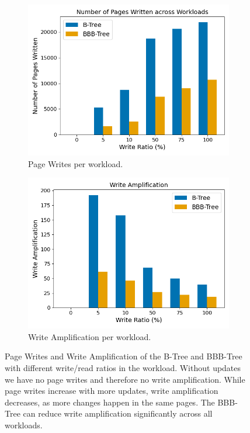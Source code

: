 \begin{figure}[htpb]
  \centering
  \begin{subfigure}[t]{0.49\textwidth}
    \centering
    \includegraphics[width=\textwidth]{figures/evaluation/pageviews_write_ratios.png}
    \caption{Page Writes per workload.}
    \label{fig:write-ratios-page-writes}
  \end{subfigure}
  \hfill
  \begin{subfigure}[t]{0.49\textwidth}
    \centering
    \includegraphics[width=\textwidth]{figures/evaluation/pageviews_write_ratios_wa.png}
    \caption{Write Amplification per workload.}
    \label{fig:write-ratios-wa}
  \end{subfigure}
  \caption{Page Writes and Write Amplification of the B-Tree and BBB-Tree with different write/read ratios in the workload. Without updates we have no page writes and therefore no write amplification. While page writes increase with more updates, write amplification decreases, as more changes happen in the same pages. The BBB-Tree can reduce write amplification significantly across all workloads.}  
  \label{fig:write-ratios}
\end{figure}

